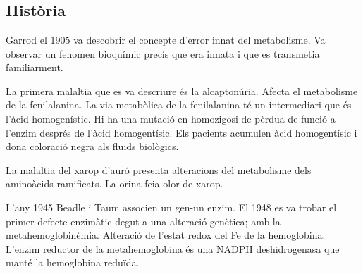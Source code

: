 \section{}
\subsection{Història}
Garrod el 1905 va descobrir el concepte d'error innat del metabolisme. Va observar un fenomen bioquímic precís que era innata i que es transmetia familiarment.

La primera malaltia que es va descriure és la alcaptonúria. Afecta el metabolisme de la fenilalanina. La via metabòlica de la fenilalanina té un intermediari que és l'àcid homogenístic. Hi ha una mutació en homozigosi de pèrdua de funció a l'enzim després de l'àcid homogentísic. Els pacients acumulen àcid homogentísic i dona coloració negra als fluids biològics.

La malaltia del xarop d'auró presenta alteracions del metabolisme dels aminoàcids ramificats. La orina feia olor de xarop.

L'any 1945 Beadle i Taum associen un gen-un enzim. El 1948 es va trobar el primer defecte enzimàtic degut a una alteració genètica; amb la metahemoglobinèmia. Alteració de l'estat redox del Fe de la hemoglobina. L'enzim reductor de la metahemoglobina és una NADPH deshidrogenasa que manté la hemoglobina reduïda.